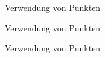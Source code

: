 \medskip



\bigskip

Verwendung von Punkten



\medskip



\bigskip
Verwendung von Punkten



\medskip



\bigskip
Verwendung von Punkten



\medskip


